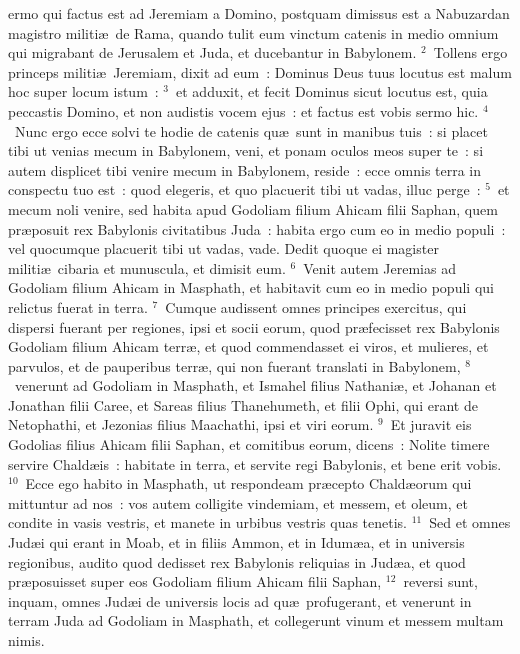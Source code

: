 \bchapter
{}ermo qui factus est ad Jeremiam a Domino, postquam dimissus est a Nabuzardan magistro militi\ae\ de Rama, quando tulit eum vinctum catenis in medio omnium qui migrabant de Jerusalem et Juda, et ducebantur in Babylonem.
${}^{2}$~Tollens ergo princeps militi\ae\ Jeremiam, dixit ad eum~: Dominus Deus tuus locutus est malum hoc super locum istum~:
${}^{3}$~et adduxit, et fecit Dominus sicut locutus est, quia peccastis Domino, et non audistis vocem ejus~: et factus est vobis sermo hic.
${}^{4}$~Nunc ergo ecce solvi te hodie de catenis qu\ae\ sunt in manibus tuis~: si placet tibi ut venias mecum in Babylonem, veni, et ponam oculos meos super te~: si autem displicet tibi venire mecum in Babylonem, reside~: ecce omnis terra in conspectu tuo est~: quod elegeris, et quo placuerit tibi ut vadas, illuc perge~:
${}^{5}$~et mecum noli venire, sed habita apud Godoliam filium Ahicam filii Saphan, quem pr\ae posuit rex Babylonis civitatibus Juda~: habita ergo cum eo in medio populi~: vel quocumque placuerit tibi ut vadas, vade. Dedit quoque ei magister militi\ae\ cibaria et munuscula, et dimisit eum.
${}^{6}$~Venit autem Jeremias ad Godoliam filium Ahicam in Masphath, et habitavit cum eo in medio populi qui relictus fuerat in terra.
${}^{7}$~Cumque audissent omnes principes exercitus, qui dispersi fuerant per regiones, ipsi et socii eorum, quod pr\ae fecisset rex Babylonis Godoliam filium Ahicam terr\ae , et quod commendasset ei viros, et mulieres, et parvulos, et de pauperibus terr\ae , qui non fuerant translati in Babylonem,
${}^{8}$~venerunt ad Godoliam in Masphath, et Ismahel filius Nathani\ae , et Johanan et Jonathan filii Caree, et Sareas filius Thanehumeth, et filii Ophi, qui erant de Netophathi, et Jezonias filius Maachathi, ipsi et viri eorum.
${}^{9}$~Et juravit eis Godolias filius Ahicam filii Saphan, et comitibus eorum, dicens~: Nolite timere servire Chald\ae is~: habitate in terra, et servite regi Babylonis, et bene erit vobis.
${}^{10}$~Ecce ego habito in Masphath, ut respondeam pr\ae cepto Chald\ae orum qui mittuntur ad nos~: vos autem colligite vindemiam, et messem, et oleum, et condite in vasis vestris, et manete in urbibus vestris quas tenetis.
${}^{11}$~Sed et omnes Jud\ae i qui erant in Moab, et in filiis Ammon, et in Idum\ae a, et in universis regionibus, audito quod dedisset rex Babylonis reliquias in Jud\ae a, et quod pr\ae posuisset super eos Godoliam filium Ahicam filii Saphan,
${}^{12}$~reversi sunt, inquam, omnes Jud\ae i de universis locis ad qu\ae\ profugerant, et venerunt in terram Juda ad Godoliam in Masphath, et collegerunt vinum et messem multam nimis.


